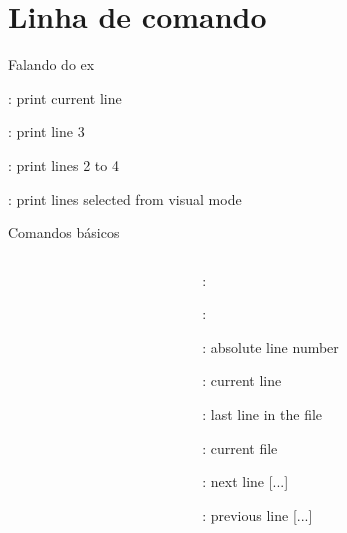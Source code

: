 \section{Linha de comando}

\begin{frame}{Falando do ex}
    \begin{widedescription}
        \item {}: print current line
        \item {}: print line 3
        \item {}: print lines 2 to 4
        \item {}: print lines selected from visual mode
    \end{widedescription}
\end{frame}

\begin{frame}{Comandos básicos}
    \begin{columns}
        \begin{column}{0.45\linewidth}
            \begin{widedescription}
                \item {}
                \item {}
                \item {}
                \item {}
            \end{widedescription}
        \end{column}
        
        \begin{column}{0.56\textwidth}
            \begin{widedescription}
                \item \key{[range]}: 
                \item {}: 
                    \small
                    \begin{description}
                        \item {}: absolute line number
                        \item {}: current line
                        \item \key{\$}: last line in the file
                        \item \key{\%}: current file
                        \item {}: next line [...]
                        \item {}: previous line [...]
                    \end{description}
            \end{widedescription}
        \end{column}
    \end{columns}
\end{frame}

